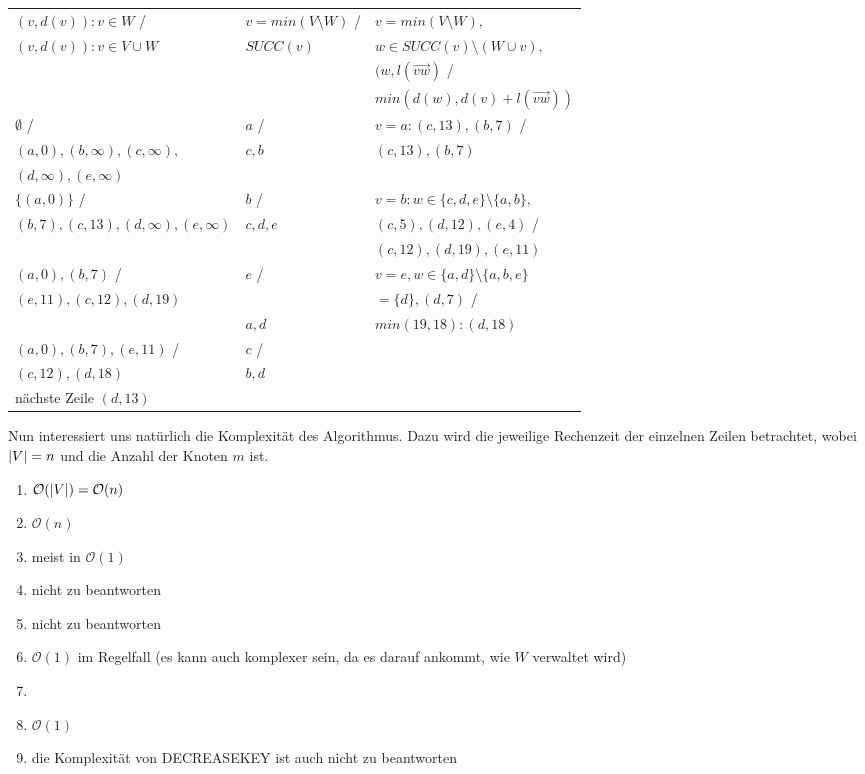 \documentclass[ngerman,draft,parskip=half*,twoside]{scrreprt}
\theoremstyle{break}
\theoremstyle{nonumberbreak}
\newcommand*{\OO}{\mathcal{O}}      %
\DeclarePairedDelimiter{\abs}{\lvert}{\rvert}
\begin{document}
\begin{tabular}{|l|l|l|}\hline
$(v,d(v)):v \in W$ /		& $v = min(V \setminus W)$ /	& $v=min(V \setminus W),$ \\
$ (v,d(v)): v \in V\cup W$	& $SUCC(v)$		& $w \in SUCC(v)\setminus (W\cup {v}),$ \\
				&			& $(w,l(\vec{vw})$ / \\
				&			& $min(d(w),d(v)+l(\vec{vw}))$ \\ \hline

$\emptyset$ /			& $a$ /			& $v=a:(c,13),(b,7)$ / \\
$(a,0),(b,\infty),(c,\infty),$	& $c,b$			& $(c,13),(b,7)$ \\
$(d,\infty),(e,\infty)$		& 			& \\ \hline

$\{(a,0)\}$ /			& $b$ /			& $v=b:w\in \{c,d,e\}\setminus \{a,b\},$ \\
$(b,7),(c,13),(d,\infty),(e,\infty)$ & $c,d,e$		& $(c,5),(d,12),(e,4)$ / \\
				&			& $(c,12),(d,19),(e,11)$ \\ \hline

$(a,0),(b,7)$ /			& $e$ /			& $v=e, w\in\{a,d\}\setminus \{a,b,e\}$ \\
$(e,11),(c,12),(d,19)$		&			& $=\{d\}, (d,7)$ / \\
				& $a,d$			& $min(19,18):(d,18)$ \\ \hline

$(a,0),(b,7),(e,11)$ /		& $c$ /			& \\
$(c,12),(d,18)$			& $b,d$			& \\
nächste Zeile $(d,13)$		&			& \\ \hline
\end{tabular}


Nun interessiert uns natürlich die Komplexität des Algorithmus. Dazu wird die jeweilige Rechenzeit
der einzelnen Zeilen betrachtet, wobei $\abs{V}=n$ und die Anzahl der
Knoten $m$ ist.
\begin{enumerate}
\item $\OO(\abs{V}) = \OO(n)$
\item $\OO(n)$
\item meist in $\OO(1)$
\item nicht zu beantworten
\item nicht zu beantworten
\item $\OO(1)$ im Regelfall (es kann auch komplexer sein, da es darauf ankommt, wie $W$ verwaltet wird)
\item
\item $\OO(1)$
\item die Komplexität von DECREASEKEY ist auch nicht zu beantworten
\end{enumerate}
\end{document}
